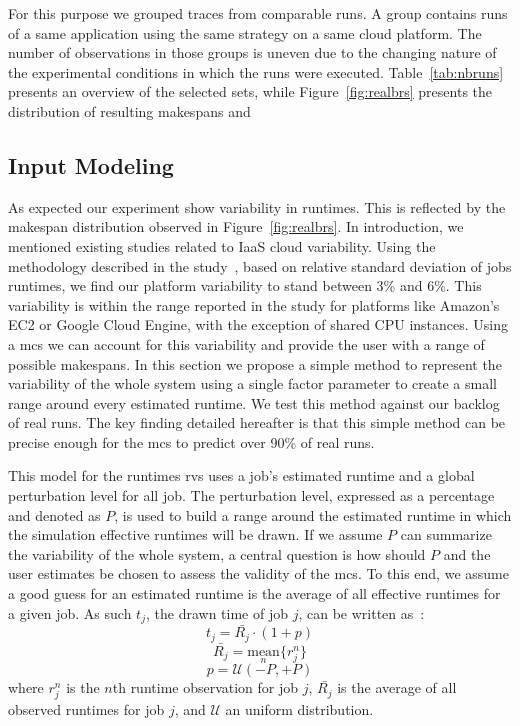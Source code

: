 \documentclass[10pt,conference,compsocconf]{IEEEtran}
\begin{document}
For this purpose we grouped traces  from comparable runs.  A group contains runs
of a  same application  using the same  strategy on a  same cloud  platform. The
number of observations in  those groups is uneven due to  the changing nature of
the    experimental   conditions    in   which    the   runs    were   executed.
Table~\ref{tab:nbruns}  presents  an  overview   of  the  selected  sets,  while
Figure~\ref{fig:realbrs} presents the distribution of resulting makespans and


\subsection{Input Modeling}\label{sec:im}

As expected our experiment show variability in runtimes. This is reflected by
the makespan distribution observed in Figure~\ref{fig:realbrs}. In introduction,
we mentioned existing studies related to IaaS cloud variability. Using the
methodology described in the study~\cite{LeitnerC16}, based on relative standard
deviation of jobs runtimes, we find our platform variability to stand between
3\% and 6\%. This variability is within the range reported in the study for
platforms like Amazon's EC2 or Google Cloud Engine, with the exception of shared
CPU instances.
Using a  \ac{mcs} we can account for this  variability and provide the
user with  a range of  possible makespans. In this  section we propose  a simple
method to  represent the variability of  the whole system using  a single factor
parameter to create  a small range around every estimated  runtime. We test this
method against our backlog of real  runs.  The key finding detailed hereafter is
that this simple method  can be precise enough for the  \ac{mcs} to predict over
90\% of real runs.

This model for the runtimes \acp{rv} uses a job's estimated runtime and a global
perturbation  level  for  all  job.   The perturbation  level,  expressed  as  a
percentage and denoted as  $P$, is used  to build a  range around  the estimated
runtime in which the simulation effective  runtimes will be drawn. If we assume
$P$ can summarize the variability of the whole system, a central question is how
should  $P$  and the  user estimates be  chosen to  assess the  validity of  the
\ac{mcs}.
To this end, we assume a  good guess for an estimated  runtime is the
average of all effective runtimes for a given job. As such $t_j$, the drawn time
of job $j$, can be written as~:
\begin{equation}
	t_j = \bar{R_j} \cdot (1 + p)
	\label{eq:t}
\end{equation}
\begin{equation}
	\bar{R_j} = \underset{n}{\textrm{mean}}\{r_j^n\}
\end{equation}
\begin{equation}
	p = \mathcal{U}(-P,+P)
	\label{eq:r}
\end{equation}
where $r_j^n$ is the $n$th runtime observation for job $j$, $\bar{R_j}$ is the
average of all observed runtimes for job $j$, and $\mathcal{U}$ an uniform distribution.
\end{document}
